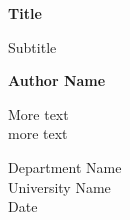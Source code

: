 \begin{titlepage}
    \begin{center}
        \vspace*{1cm}
        
        \Huge
        \textbf{Title}
        
        \vspace{0.5cm}
        \LARGE
        Subtitle
        
        \textbf{Author Name}
        
        \vfill
        
        More text \\
        more text
        
        \vspace{0.8cm}
        
        
        \Large
        Department Name \\
        University Name \\
        Date
        
    \end{center}

\end{titlepage}
